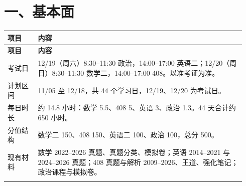 \documentclass[UTF8,a4paper,11pt]{ctexart}
\begin{document}
\section{一、基本面}
{\small\renewcommand{\arraystretch}{1.38}\setlength{\tabcolsep}{3.5pt}
\begin{longtable}{P{0.12\linewidth}P{0.82\linewidth}}
\toprule
\bfseries 项目 & \bfseries 内容 \\
\midrule
\endfirsthead
\toprule
\bfseries 项目 & \bfseries 内容 \\
\midrule
\endhead
考试日 & 12/19（周六）8:30–11:30 政治，14:00–17:00 英语二；12/20（周日）8:30–11:30 数学二，14:00–17:00 408。以准考证为准。 \\
\addlinespace[.35em]
计划区间 & 11/05 至 12/18，共 44 个学习日，12/19、12/20 为考试日。 \\
\addlinespace[.35em]
每日时长 & 约 14.8 小时：数学 5.5、408 5、英语 3、政治 1.3。44 天合计约 650 小时。 \\
\addlinespace[.35em]
分值结构 & 数学二 150、408 150、英语二 100、政治 100，总分 500。 \\
\addlinespace[.35em]
现有材料 & 数学 2022–2026 真题、真题分类、模拟卷；英语 2014–2021 与 2024–2026 真题；408 真题与解析 2009–2026、王道、强化笔记；政治课程与模拟卷。 \\
\addlinespace[.35em]
\bottomrule
\end{longtable}
}
\end{document}
